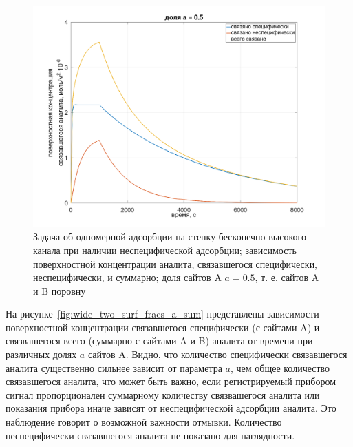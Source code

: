 \documentclass[oneside,final,12pt]{extreport}
\begin{document}
\begin{figure}
  \centering
  \includegraphics[width=.7\textwidth]{pic/flat_wide_twosurf_example}

  \caption{%
    \label{fig:flat_wide_two_surf_example}%
    Задача об одномерной адсорбции на стенку бесконечно высокого канала
    при наличии неспецифической адсорбции;
    зависимость поверхностной концентрации аналита,
    связавшегося специфически, неспецифически, и суммарно;
    доля сайтов A $a = 0.5$, т. е. сайтов A и B поровну
  }

\end{figure}

На рисунке~\ref{fig:wide_two_surf_fracs_a_sum} представлены зависимости
поверхностной концентрации связавшегося специфически (с сайтами A) и
связвашегося всего (суммарно с сайтами A и B)
аналита от времени при различных долях $a$ сайтов A.
Видно, что количество специфически связавшегося аналита существенно сильнее
зависит от параметра $a$, чем общее количество связавшегося аналита,
что может быть важно, если регистрируемый прибором сигнал пропорционален
суммарному количеству связвашегося аналита или
показания прибора иначе зависят от неспецифической адсорбции аналита.
Это наблюдение говорит о возможной важности отмывки.
Количество неспецифически связавшегося аналита не показано для наглядности.
\end{document}
